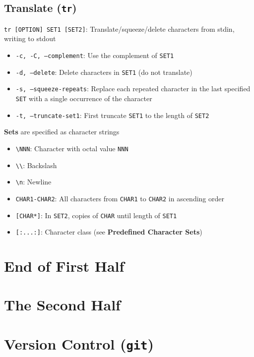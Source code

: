 \documentclass[13pt]{article}
\begin{document}
\subsection{Translate (\texttt{tr})}
\texttt{tr [OPTION] SET1 [SET2]}: Translate/squeeze/delete characters from stdin, writing to stdout
\begin{itemize}[leftmargin = 0pt]
\item [] \texttt{-c, -C, --complement}: Use the complement of \texttt{SET1}
\item [] \texttt{-d, --delete}: Delete characters in \texttt{SET1} (do not translate)
\item [] \texttt{-s, --squeeze-repeats}: Replace each repeated character in the last specified \texttt{SET} with a single occurrence of the character
\item [] \texttt{-t, --truncate-set1}: First truncate \texttt{SET1} to the length of \texttt{SET2}
\end{itemize}
\textbf{Sets} are specified as character strings
\begin{itemize}[leftmargin = 0pt]
\item [] \texttt{\textbackslash NNN}: Character with octal value \texttt{NNN}
\item [] \texttt{\textbackslash\textbackslash}: Backslash
\item [] \texttt{\textbackslash n}: Newline
\item [] \texttt{CHAR1-CHAR2}: All characters from \texttt{CHAR1} to \texttt{CHAR2} in ascending order
\item [] \texttt{[CHAR*]}: In \texttt{SET2}, copies of \texttt{CHAR} until length of \texttt{SET1}
\item [] \texttt{[:...:]}: Character class (see \textbf{Predefined Character Sets})
\end{itemize}

\section*{End of First Half}
\newpage
{}
\section*{The Second Half}

\section{Version Control (\texttt{git})}
\end{document}
